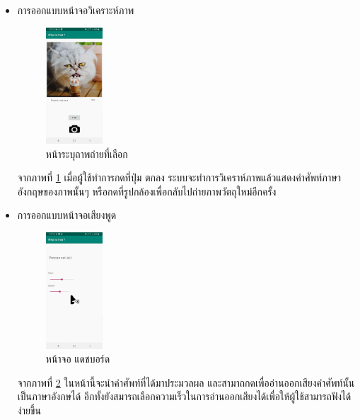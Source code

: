 				\begin{itemize}[label={--}]

\item การออกแบบหน้าจอวิเคราะห์ภาพ 
	\begin{figure}[H]
					\centering
					\includegraphics[width=0.2\textwidth]{Figures/3/UIDESIGN/pic.png}
					\caption{หน้าระบุถาพถ่ายที่เลือก}
					\label{Fig:2}
				\end{figure}
				จากภาพที่ \ref{Fig:2} เมื่อผู้ใช้ทำการกดที่ปุ่ม ตกลง ระบบจะทำการวิเคราห์ภาพแล้วแสดงคำศัพท์ภาษาอังกฤษของภาพนั้นๆ หรือกดที่รูปกล้องเพื่อกลับไปถ่ายภาพวัตถุใหม่อีกครั้ง
			\end{itemize}
	\begin{itemize}[label={--}]
\item การออกแบบหน้าจอเสียงพูด 
				\begin{figure}[H]
								\centering
								\includegraphics[width=0.2\textwidth]{Figures/3/UIDESIGN/speak.png}
								\caption{หน้าจอ แดชบอร์ด}
								\label{Fig:5}
							\end{figure}
							จากภาพที่ \ref{Fig:5} ในหน้านี้จะนำคำศัพท์ที่ได้มาประมวลผล และสามาถกดเพื่ออ่านออกเสียงคำศัพท์นั้นเป็นภาษาอังกษได้ อีกทั้งยังสมารถเลือกความเร็วในการอ่านออกเสียงได้เพื่อให้ผู้ใช้สามารถฟังได้ง่ายขึ้น
						\end{itemize}
							\newpage

\begin{itemize}[label={--}]

								
									\end{itemize}


